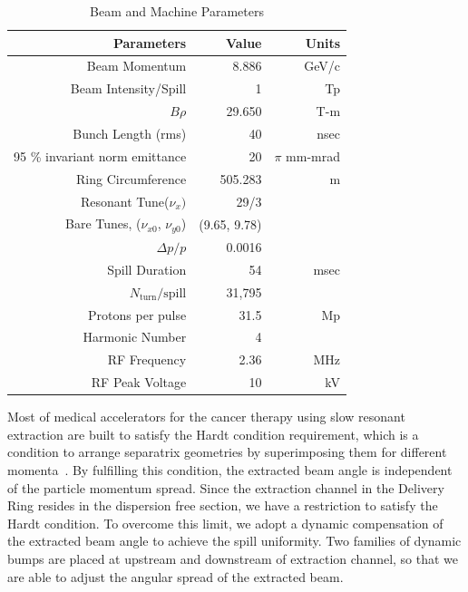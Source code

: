\documentclass[aps,prstab,onecolumn,preprint]{revtex4-1}
\begin{document}
\begin{table}[hbp]
    \begin{tabular}{rrr}
    \hline
      Parameters                             & Value          & Units         \\
    \hline
      Beam Momentum                          & 8.886          & GeV/c         \\
      Beam Intensity/Spill                   & 1              & Tp            \\
      $B \rho$                               & 29.650         & T-m           \\
      Bunch Length (rms)                     & 40             & nsec          \\
      95 \% invariant norm emittance         & 20             & $\pi$ mm-mrad \\
      Ring Circumference                     & 505.283        & m             \\
      Resonant Tune($\nu_{x})$               & 29/3           &               \\
      Bare Tunes, ($\nu_{x0}$, $\nu_{y0}$)   & (9.65, 9.78)   &               \\
      $\Delta p / p$                         & 0.0016         &               \\
      Spill Duration                         &  54            & msec          \\
      $N_{\text{turn}} / {\text{spill}}$     & 31,795         &               \\
      Protons per pulse                      & 31.5           & Mp            \\
      Harmonic Number                        & 4              &               \\
      RF Frequency                           & 2.36           & MHz           \\
      RF Peak Voltage                        & 10             & kV            \\
    \hline
    \end{tabular}
    \caption{\label{table:param}Beam and Machine Parameters}
\end{table}


Most of medical accelerators for the cancer therapy using slow resonant extraction are built to satisfy the Hardt condition requirement, which is a condition to arrange separatrix geometries by superimposing them for different momenta~\cite{hardt,pullia,pimms}. By fulfilling this condition, the extracted beam angle is independent of the particle momentum spread. Since the extraction channel in the Delivery Ring resides in the dispersion free section, we have a restriction to satisfy the Hardt condition. To overcome this limit, we adopt a dynamic compensation of the extracted beam angle to achieve the spill uniformity. Two families of dynamic bumps are placed at upstream and downstream of extraction channel, so that we are able to adjust the angular spread of the extracted beam.
\end{document}
